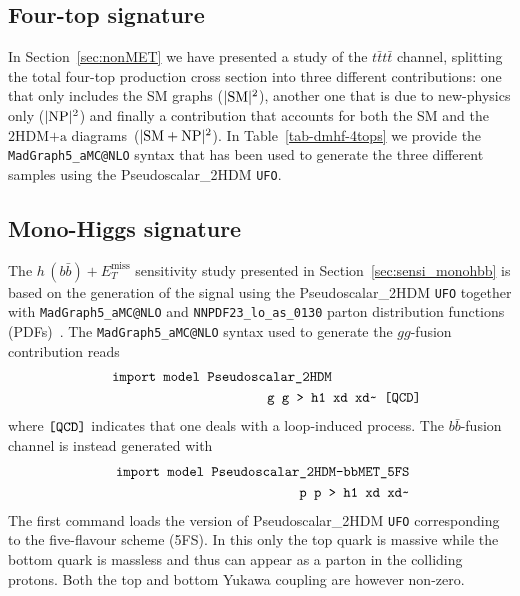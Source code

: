 \documentclass[a4paper, 11pt,notoc]{article}
\newcommand{\MET}{\ensuremath{E_T^\mathrm{miss}}\xspace}
\newcommand{\hdma}{\ensuremath{\textrm{2HDM+a}}\xspace}
\begin{document}
\subsection*{Four-top signature}

In Section~\ref{sec:nonMET} we have presented a study of the $t \bar t t \bar t$ channel, splitting the  total four-top production cross section into three different contributions: one that only includes the SM graphs ($|{\rm SM}|^2$), another one that is due to new-physics only ($|{\rm NP}|^2$) and finally a contribution that accounts for both the SM and the \hdma diagrams~($|{\rm SM} + {\rm NP}|^2$). In Table~\ref{tab-dmhf-4tops} we provide the {\tt MadGraph5\_aMC@NLO} syntax that has been used to generate the three different samples using the Pseudoscalar\_2HDM {\tt UFO}. 

\subsection*{Mono-Higgs signature}

The $h \, (b \bar b) + \MET$ sensitivity study presented in Section~\ref{sec:sensi_monohbb} is based on the generation of the signal using the Pseudoscalar\_2HDM {\tt UFO} together with {\tt MadGraph5\_aMC@NLO} and {\tt NNPDF23\_lo\_as\_0130} parton distribution functions (PDFs)~\cite{Ball:2012cx}. The {\tt MadGraph5\_aMC@NLO}  syntax used to generate the $gg$-fusion contribution reads 
\begin{eqnarray}
&& \verb| import model Pseudoscalar_2HDM | \hspace{2.25cm} \nonumber \\
&& \verb| g g > h1 xd xd~ [QCD] | \nonumber 
\end{eqnarray}
where  $\verb|[QCD]|$ indicates that one deals with a loop-induced process. The $b \bar b$-fusion channel is instead generated with 
\begin{eqnarray}
&& \verb| import model Pseudoscalar_2HDM-bbMET_5FS  | \nonumber \\
&& \verb| p p > h1 xd xd~  | \nonumber 
\end{eqnarray}
The first command loads the version of Pseudoscalar\_2HDM {\tt UFO}  corresponding to the five-flavour scheme (5FS). In this only the top quark is massive while the bottom quark is massless and thus 
can appear as a parton in the colliding protons. Both the top and bottom Yukawa coupling  are however non-zero.
\end{document}
